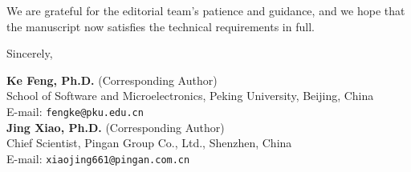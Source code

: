 \documentclass[11pt,a4paper]{article}
\begin{document}
\vspace{1em}
\noindent We are grateful for the editorial team's patience and guidance, and we hope that the manuscript now satisfies the technical requirements in full.

\vspace{1.6em}
\noindent Sincerely,

\vspace{1em}
\noindent\textbf{Ke Feng, Ph.D.} (Corresponding Author)\\
School of Software and Microelectronics, Peking University, Beijing, China\\
E-mail: \texttt{fengke@pku.edu.cn}\\[0.8em]
\textbf{Jing Xiao, Ph.D.} (Corresponding Author)\\
Chief Scientist, Pingan Group Co., Ltd., Shenzhen, China\\
E-mail: \texttt{xiaojing661@pingan.com.cn}
\end{document}
